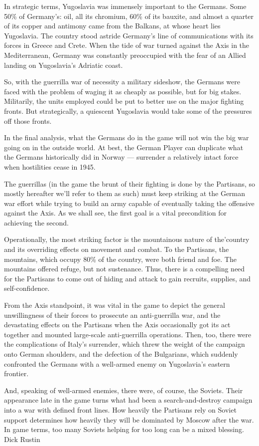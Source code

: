In strategic terms, Yugoslavia was immensely important to the Germans. Some 50\% of Germany’s: oil, all its chromium, 60\% of its bauxite, and almost a quarter of its copper and antimony came from the Balkans, at whose heart lies Yugoslavia. The country stood astride Germany’s line of communications with its forces in Greece and Crete. When the tide of war turned against the Axis in the Mediterranean, Germany was constantly preoccupied with the fear of an Allied landing on Yugoslavia’s Adriatic coast.

So, with the guerrilla war of necessity a military sideshow, the Germans were faced with the problem of waging it as cheaply as possible, but for big stakes. Militarily, the units employed could be put to better use on the major fighting fronts. But strategically, a quiescent Yugoslavia would take some of the pressures off those fronts.

In the final analysis, what the Germans do in the game will not win the big war going on in the outside world. At best, the German Player can duplicate what the Germans historically did in Norway — surrender a relatively intact force when hostilities cease in 1945.

The guerrillas (in the game the brunt of their fighting is done by the Partisans, so mostly hereafter we’ll refer to them as such) must keep striking at the German war effort while trying to build an army capable of eventually taking the offensive against the Axis. As we shall see, the first goal is a vital precondition for achieving the second.

Operationally, the most striking factor is the mountainous nature of the'country and its overriding effects on movement and combat. To the Partisans, the mountains, which occupy 80\% of the country, were both friend and foe. The mountains offered refuge, but not sustenance. Thus, there is a compelling need for the Partisans to come out of hiding and attack to gain recruits, supplies, and self-confidence.

From the Axis standpoint, it was vital in the game to depict the general unwillingness of their forces to prosecute an anti-guerrilla war, and the devastating effects on the Partisans when the Axis occasionally got its act together and mounted large-scale anti-guerrilla operations. Then, too, there were the complications of Italy’s surrender, which threw the weight of the campaign onto German shoulders, and the defection of the Bulgarians, which suddenly confronted the Germans with a well-armed enemy on Yugoslavia’s eastern frontier.

And, speaking of well-armed enemies, there were, of course, the Soviets. Their appearance late in the game turns what had been a search-and-destroy campaign into a war with defined front lines. How heavily the Partisans rely on Soviet support determines how heavily they will be dominated by Moscow after the war. In game terms, too many Soviets helping for too long can be a mixed blessing. Dick Rustin
